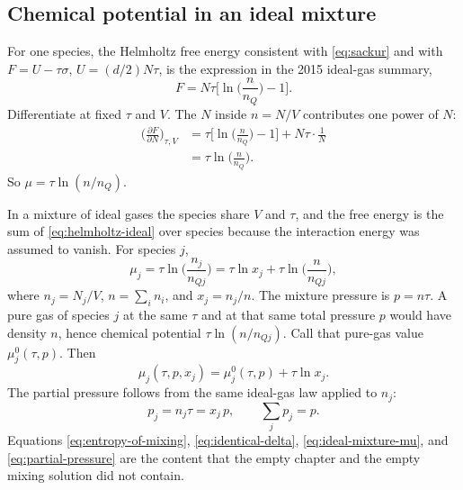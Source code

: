 \subsection{Chemical potential in an ideal mixture}

For one species, the Helmholtz free energy consistent with \eqref{eq:sackur} and with \(F = U - \tau\sigma\), \(U = (d/2) N\tau\), is the expression in the 2015 ideal-gas summary,
\begin{equation}
\label{eq:helmholtz-ideal}
F = N\tau\Biggl[\ln\biggl(\frac{n}{n_Q}\biggr) - 1\Biggr].
\end{equation}
Differentiate at fixed \(\tau\) and \(V\). The \(N\) inside \(n = N/V\) contributes one power of \(N\):
\begin{align}
\biggl(\frac{\partial F}{\partial N}\biggr)_{\tau,V}
&= \tau\Biggl[\ln\biggl(\frac{n}{n_Q}\biggr) - 1\Biggr]
 + N\tau\cdot\frac{1}{N} \nonumber\\
&= \tau\ln\biggl(\frac{n}{n_Q}\biggr).
\label{eq:mu-one-species}
\end{align}
So \(\mu = \tau\ln(n/n_Q)\).

In a mixture of ideal gases the species share \(V\) and \(\tau\), and the free energy is the sum of \eqref{eq:helmholtz-ideal} over species because the interaction energy was assumed to vanish. For species \(j\),
\begin{equation}
\label{eq:mu-mixture}
\mu_j
= \tau\ln\biggl(\frac{n_j}{n_{Qj}}\biggr)
= \tau\ln x_j + \tau\ln\biggl(\frac{n}{n_{Qj}}\biggr),
\end{equation}
where \(n_j = N_j/V\), \(n = \sum_i n_i\), and \(x_j = n_j/n\). The mixture pressure is \(p = n\tau\). A pure gas of species \(j\) at the same \(\tau\) and at that same total pressure \(p\) would have density \(n\), hence chemical potential \(\tau\ln(n/n_{Qj})\). Call that pure-gas value \(\mu_j^{0}(\tau,p)\). Then
\begin{equation}
\label{eq:ideal-mixture-mu}
\mu_j(\tau,p,x_j) = \mu_j^{0}(\tau,p) + \tau\ln x_j.
\end{equation}
The partial pressure follows from the same ideal-gas law applied to \(n_j\):
\begin{equation}
\label{eq:partial-pressure}
p_j = n_j\tau = x_j\, p,
\qquad
\sum_j p_j = p.
\end{equation}
Equations \eqref{eq:entropy-of-mixing}, \eqref{eq:identical-delta}, \eqref{eq:ideal-mixture-mu}, and \eqref{eq:partial-pressure} are the content that the empty chapter and the empty mixing solution did not contain.
